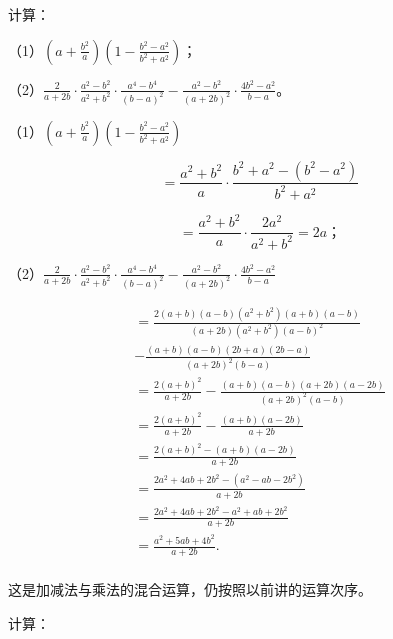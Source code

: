  计算：

（1）\(\left(a + \frac{b^2}{a}\right)\left(1 - \frac{b^2 - a^2}{b^2 + a^2}\right)\)；

（2）\(\frac{2}{a + 2b} \cdot \frac{a^2 - b^2}{a^2 + b^2} \cdot \frac{a^4 - b^4}{(b - a)^2} - \frac{a^2 - b^2}{(a + 2b)^2} \cdot \frac{4b^2 - a^2}{b - a}\)。

（1）\(\left(a + \frac{b^2}{a}\right)\left(1 - \frac{b^2 - a^2}{b^2 + a^2}\right)\)

\[
= \frac{a ^{2} + b ^{2}}{a} \cdot \frac{b ^{2} + a ^{2} - (b ^{2} - a ^{2})}{b ^{2} + a ^{2}}
\]

\[
= \frac{a ^{2} + b ^{2}}{a} \cdot \frac{2 a ^{2}}{a ^{2} + b ^{2}} = 2 a\text{；}
\]

（2）\(\frac{2}{a + 2b} \cdot \frac{a^2 - b^2}{a^2 + b^2} \cdot \frac{a^4 - b^4}{(b - a)^2} - \frac{a^2 - b^2}{(a + 2b)^2} \cdot \frac{4b^2 - a^2}{b - a}\)

\[
\begin{array}{l} = \frac{2 (a + b) (a - b) (a ^{2} + b ^{2}) (a + b) (a - b)}{(a + 2 b) (a ^{2} + b ^{2}) (a - b) ^{2}} \\ - \frac{(a + b) (a - b) (2 b + a) (2 b - a)}{(a + 2 b) ^{2} (b - a)} \\ = \frac{2 (a + b) ^{2}}{a + 2 b} - \frac{(a + b) (a - b) (a + 2 b) (a - 2 b)}{(a + 2 b) ^{2} (a - b)} \\ = \frac{2 (a + b) ^{2}}{a + 2 b} - \frac{(a + b) (a - 2 b)}{a + 2 b} \\ = \frac{2 (a + b) ^{2} - (a + b) (a - 2 b)}{a + 2 b} \\ = \frac{2 a ^{2} + 4 a b + 2 b ^{2} - (a ^{2} - a b - 2 b ^{2})}{a + 2 b} \\ = \frac{2 a ^{2} + 4 a b + 2 b ^{2} - a ^{2} + a b + 2 b ^{2}}{a + 2 b} \\ = \frac{a ^{2} + 5 a b + 4 b ^{2}}{a + 2 b}. \\ \end{array}
\]

这是加减法与乘法的混合运算，仍按照以前讲的运算次序。

计算：

